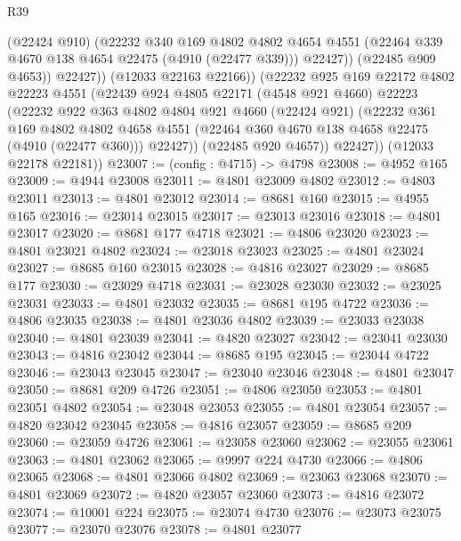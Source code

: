 \begin{lexlean}{R39}
\begin{coremodule}
                  (@22424 @910)
                  (@22232
                    @340
                    @169
                    @4802
                    @4802
                    @4654
                    @4551
                    (@22464 @339 @4670 @138 @4654 @22475 (@4910 (@22477 @339)))
                    @22427))
                (@22485 @909 @4653))
              @22427))
          (@12033 @22163 @22166))
        (@22232
          @925
          @169
          @22172
          @4802
          @22223
          @4551
          (@22439
            @924
            @4805
            @22171
            (@4548 @921 @4660)
            @22223
            (@22232
              @922
              @363
              @4802
              @4804
              @921
              @4660
              (@22424 @921)
              (@22232
                @361
                @169
                @4802
                @4802
                @4658
                @4551
                (@22464 @360 @4670 @138 @4658 @22475 (@4910 (@22477 @360)))
                @22427))
            (@22485 @920 @4657))
          @22427))
      (@12033 @22178 @22181))
@23007 := (config : @4715) -> @4798
@23008 := @4952 @165
@23009 := @4944 @23008
@23011 := @4801 @23009 @4802
@23012 := @4803 @23011
@23013 := @4801 @23012
@23014 := @8681 @160
@23015 := @4955 @165
@23016 := @23014 @23015
@23017 := @23013 @23016
@23018 := @4801 @23017
@23020 := @8681 @177 @4718
@23021 := @4806 @23020
@23023 := @4801 @23021 @4802
@23024 := @23018 @23023
@23025 := @4801 @23024
@23027 := @8685 @160 @23015
@23028 := @4816 @23027
@23029 := @8685 @177
@23030 := @23029 @4718
@23031 := @23028 @23030
@23032 := @23025 @23031
@23033 := @4801 @23032
@23035 := @8681 @195 @4722
@23036 := @4806 @23035
@23038 := @4801 @23036 @4802
@23039 := @23033 @23038
@23040 := @4801 @23039
@23041 := @4820 @23027
@23042 := @23041 @23030
@23043 := @4816 @23042
@23044 := @8685 @195
@23045 := @23044 @4722
@23046 := @23043 @23045
@23047 := @23040 @23046
@23048 := @4801 @23047
@23050 := @8681 @209 @4726
@23051 := @4806 @23050
@23053 := @4801 @23051 @4802
@23054 := @23048 @23053
@23055 := @4801 @23054
@23057 := @4820 @23042 @23045
@23058 := @4816 @23057
@23059 := @8685 @209
@23060 := @23059 @4726
@23061 := @23058 @23060
@23062 := @23055 @23061
@23063 := @4801 @23062
@23065 := @9997 @224 @4730
@23066 := @4806 @23065
@23068 := @4801 @23066 @4802
@23069 := @23063 @23068
@23070 := @4801 @23069
@23072 := @4820 @23057 @23060
@23073 := @4816 @23072
@23074 := @10001 @224
@23075 := @23074 @4730
@23076 := @23073 @23075
@23077 := @23070 @23076
@23078 := @4801 @23077

\end{coremodule}
\end{lexlean}
